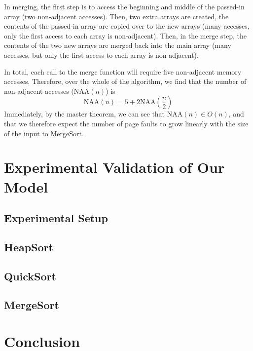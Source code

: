 \documentclass[11pt]{article}
\newcommand{\heapsort}{{\sc HeapSort}}
\newcommand{\quicksort}{{\sc QuickSort}}
\newcommand{\mergesort}{{\sc MergeSort}}
\newcommand{\NAA}{\textrm{NAA}}
\begin{document}
In merging, the first step is to access the beginning and middle of the
passed-in array (two non-adjacent accesses). Then, two extra arrays are
created, the contents of the passed-in array are copied over to the new arrays
(many accesses, only the first access to each array is non-adjacent).  Then, in
the merge step, the contents of the two new arrays are merged back into the
main array (many accesses, but only the first access to each array is
non-adjacent).

In total, each call to the merge function will require five non-adjacent memory
accesses.  Therefore, over the whole of the algorithm, we find that the number
of non-adjacent accesses ($\NAA(n)$) is $$\NAA(n) = 5 + 2  \NAA(\frac{n}{2})$$
Immediately, by the master theorem, we can see that $\NAA(n) \in O(n)$, and
that we therefore expect the number of page faults to grow linearly with the
size of the input to \mergesort.

\section{Experimental Validation of Our Model}
\subsection{Experimental Setup}
\subsection{\heapsort}
\subsection{\quicksort}
\subsection{\mergesort}

\section{Conclusion}



\end{document}
